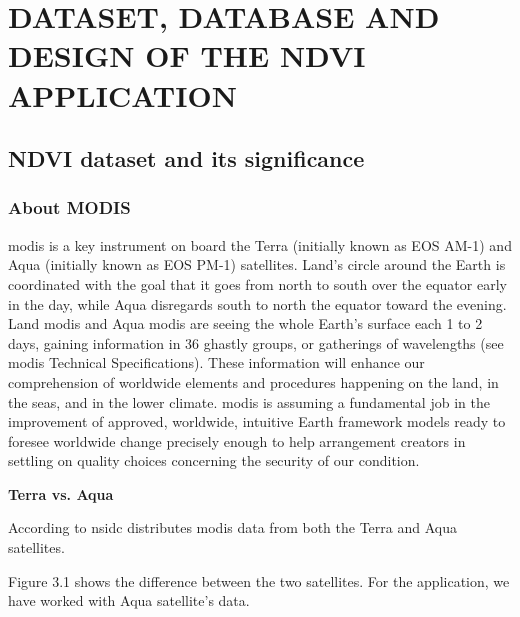 \chapter{DATASET, DATABASE AND DESIGN OF THE NDVI APPLICATION}
\label{chap:dataset & database}

\section{NDVI dataset and its significance}

\subsection{About MODIS}

\newcommand{\MYhref}[3][blue]{\href{#2}{\color{#1}{#3}}}%

\centerline{\MYhref{https://modis.gsfc.nasa.gov/}{NASA's MODIS website}}

\gls{modis} is a key instrument on board the Terra (initially known as EOS AM-1) and Aqua (initially known as EOS PM-1) satellites. Land's circle around the Earth is coordinated with the goal that it goes from north to south over the equator early in the day, while Aqua disregards south to north the equator toward the evening. Land \gls{modis} and Aqua \gls{modis} are seeing the whole Earth's surface each 1 to 2 days, gaining information in 36 ghastly groups, or gatherings of wavelengths (see \gls{modis} Technical Specifications). These information will enhance our comprehension of worldwide elements and procedures happening on the land, in the seas, and in the lower climate. \gls{modis} is assuming a fundamental job in the improvement of approved, worldwide, intuitive Earth framework models ready to foresee worldwide change precisely enough to help arrangement creators in settling on quality choices concerning the security of our condition. \cite{MODIS} \\

\centerline{\textbf{Terra vs. Aqua}}

According to \gls{nsidc} distributes \gls{modis} data from both the Terra and Aqua satellites.

Figure 3.1 shows the difference between the two satellites. For the application, we have worked with Aqua satellite's data.

